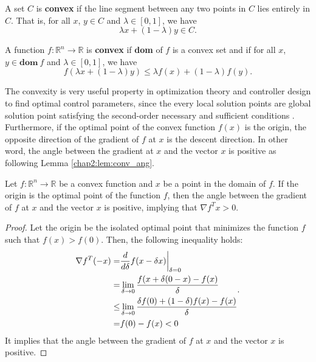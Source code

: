 \begin{definition}
  A set $C$ is \textbf{convex} if the line segment between any two points in $C$ lies entirely in $C$. That is, for all $x$, $y\in C$ and $\lambda\in [0,1]$, we have
  \begin{equation}
      \lambda x + (1-\lambda)y \in C
      .
  \end{equation}
\end{definition}

\begin{definition}
  A function $f:\mathbb R^n\to \mathbb R$ is \textbf{convex} if \textbf{dom} of $f$ is a convex set and if for all $x$, $y\in \textbf{dom}\ f$ and $\lambda\in [0,1]$, we have
  \begin{equation}
      f(\lambda x + (1-\lambda)y) \leq \lambda f(x) + (1-\lambda)f(y)
      .
  \end{equation}
\end{definition}

The convexity is very useful property in optimization theory and controller design to find optimal control parameters, since the every local solution points are global solution point satisfying the second-order necessary and sufficient conditions \cite[Theorem 2.5]{RN9}.
Furthermore, if the optimal point of the convex function $f(x)$ is the origin, the opposite direction of the gradient of $f$ at $x$ is the descent direction.
In other word, the angle between the gradient at $x$ and the vector $x$ is positive as following Lemma \ref{chap2:lem:conv_ang}.

\begin{lemma}
  Let $f:\mathbb R^n\to \mathbb R$ be a convex function and $x$ be a point in the domain of $f$.
  If the origin is the optimal point of the function $f$, then the angle between the gradient of $f$ at $x$ and the vector $x$ is positive, implying that $\nabla f^Tx>0$.
  \label{chap2:lem:conv_ang}
\end{lemma}

\begin{proof}
  Let the origin be the isolated optimal point that minimizes the function $f$ such that $f(x) > f(0)$.
  Then, the following inequality holds:
  \begin{equation}
      \begin{aligned}
          \nabla f^T (-x)
          =&
          {d\over d\delta } f( x -\delta x)\bigg\vert _{\delta=0} \\
          =& \lim_{\delta\to 0} {f( x+\delta (0-x) - f( x)\over \delta}\\
          \le& \lim_{\delta\to0} {\delta f(0) + (1-\delta) f( x )-f( x)\over \delta}
          \\
          =& f(0) - f( x) < 0
          \end{aligned}
          .
  \end{equation}
  It implies that the angle between the gradient of $f$ at $x$ and the vector $x$ is positive.
\end{proof}


